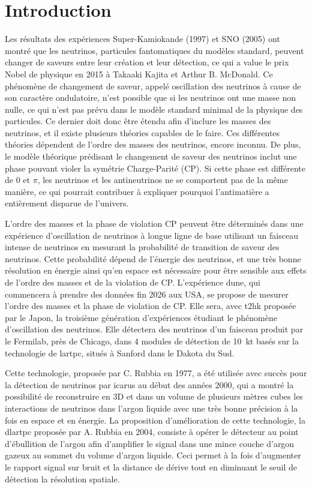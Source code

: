 \chapter{Introduction}

Les résultats des expériences Super-Kamiokande (1997) et SNO (2005) ont montré que les neutrinos, particules fantomatiques du modèles standard, peuvent changer de saveurs entre leur création et leur détection, ce qui a value le prix Nobel de physique en 2015 à Takaaki Kajita et Arthur B. McDonald.  Ce phénomène de changement de saveur, appelé oscillation des neutrinos à cause de son caractère ondulatoire, n'est possible que si les neutrinos ont une masse non nulle, ce qui n'est pas prévu dans le modèle standard minimal de la physique des particules. Ce dernier doit donc être étendu afin d'inclure les masses des neutrinos, et il existe plusieurs théories capables de le faire. Ces différentes théories dépendent de l'ordre des masses des neutrinos, encore inconnu. De plus, le modèle théorique prédisant le changement de saveur des neutrinos inclut une phase pouvant violer la symétrie Charge-Parité (CP). Si cette phase est différente de 0 et $\pi$, les neutrinos et les antineutrinos ne se comportent pas de la même manière, ce qui pourrait contribuer à expliquer pourquoi l'antimatière a entièrement disparue de l'univers. 

L'ordre des masses et la phase de violation CP peuvent être déterminés dans une expérience d'oscillation de neutrinos à longue ligne de base utilisant un faisceau intense de neutrinos en mesurant la probabilité de transition de saveur des neutrinos. Cette probabilité dépend de l'énergie des neutrinos, et une très bonne résolution en énergie ainsi qu'en espace est nécessaire pour être sensible aux effets de l'ordre des masses et de la violation de CP. L'expérience \gls{dune}, qui commencera à prendre des données fin 2026 aux USA, se propose de mesurer l'ordre des masses et la phase de violation de CP. Elle sera, avec \acrshort{t2hk} proposée par le Japon, la troisième génération d'expériences étudiant le phénomène d'oscillation des neutrinos. Elle détectera des neutrinos d'un faisceau produit par le Fermilab, près de Chicago, dans 4 modules de détection de \SI{10}{\kilo\tonne} basés sur la technologie de \gls{lartpc}, situés à Sanford dans le Dakota du Sud.

Cette technologie, proposée par C. Rubbia en 1977, a été utilisée avec succès pour la détection de neutrinos par \acrshort{icarus} au début des années 2000, qui a montré la possibilité de reconstruire en 3D et dans un volume de plusieurs mètres cubes les interactions de neutrinos dans l'argon liquide avec une très bonne précision à la fois en espace et en énergie. La proposition d'amélioration de cette technologie, la \gls{dlartpc} proposée par A. Rubbia en 2004, consiste à opérer le détecteur au point d'ébullition de l'argon afin d'amplifier le signal dans une mince couche d'argon gazeux au sommet du volume d'argon liquide. Ceci permet à la fois d'augmenter le rapport signal sur bruit et la distance de dérive tout en diminuant le seuil de détection la résolution spatiale. 

